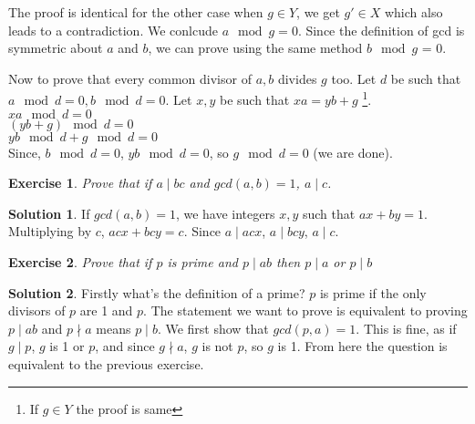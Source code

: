 \documentclass[a4paper,10pt]{article}
\newtheorem{exercise}{Exercise}[section]
\theoremstyle{definition} %
\newtheorem*{solution}{Solution}
\begin{document}
        The proof is identical for the other case when $g \in Y$, we get $g' \in X$
        which also leads to a contradiction. We conlcude $a \mod g = 0$. Since the 
        definition of gcd is symmetric about $a$ and $b$, we can prove using the same
        method $b \mod g$ = 0.

        Now to prove that every common divisor of $a, b$ divides $g$ too. Let $d$ be 
        such that $a \mod d = 0, b \mod d = 0$. Let $x,y$ be such that $xa = yb + g$
        \footnote{If $g \in Y$ the proof is same}. \\
        $xa \mod d = 0$ \\
        $(yb + g) \mod d = 0$ \\
        $yb \mod d + g \mod d = 0$ \\
        Since, $b \mod d = 0$, $yb \mod d = 0$, so $g \mod d = 0$ (we are done).

        \begin{exercise}
            Prove that if $a \mid bc$ and $gcd(a, b) = 1$, $a \mid c$.
        \end{exercise}
        \begin{solution}
            If $gcd(a, b) = 1$, we have integers $x,y$ such that $ax + by = 1$. Multiplying
            by $c$, $acx + bcy = c$. Since $a \mid acx$, $a \mid bcy$, $ a \mid c$. 
        \end{solution}

        \begin{exercise}
            Prove that if $p$ is prime and $p \mid ab$ then $p \mid a $ or $p \mid b$
        \end{exercise}
        \begin{solution}
            Firstly what's the definition of a prime? $p$ is prime if the only divisors
            of $p$ are 1 and $p$. The statement we want to prove is equivalent to proving
            $p \mid ab$ and $p \nmid a$ means $p \mid b$. We first show that $gcd(p,a) = 1$.
            This is fine, as if $g \mid p$, $g$ is 1 or $p$, and since $g \nmid a$, $g$ is not
            $p$, so $g$ is 1. From here the question is equivalent to the previous exercise.
        \end{solution}
\end{document}
